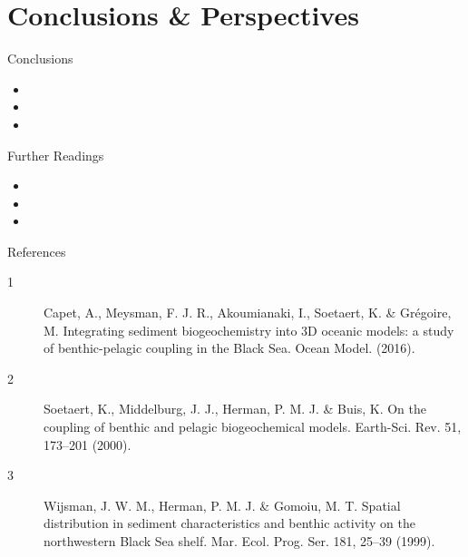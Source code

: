 \documentclass[final]{beamer}
\begin{document}
\begin{frame}[fragile]
\begin{columns}[T]
\begin{column}{.33\textwidth}
	  

	
	
	\section{Conclusions \& Perspectives}
	\begin{alertblock}{Conclusions}
	      \begin{itemize}
		    \item 
	        \item 
	        \item 
	      \end{itemize}
	\end{alertblock}
	
	\begin{block}{Further Readings}
	      \begin{itemize}
		    \item 
	        \item 
	        \item 
	      \end{itemize}
	\end{block}
	
	\begin{block}{References}
	  \footnotesize
	  \begin{description}
	    \item[1] Capet, A., Meysman, F. J. R., Akoumianaki, I., Soetaert, K. \& Grégoire, M. Integrating sediment biogeochemistry into 3D oceanic models: a study of benthic-pelagic coupling in the Black Sea. Ocean Model. (2016).
	    \item[2] Soetaert, K., Middelburg, J. J., Herman, P. M. J. \& Buis, K. On the coupling of benthic and pelagic biogeochemical models. Earth-Sci. Rev. 51, 173–201 (2000).
	    \item[3] Wijsman, J. W. M., Herman, P. M. J. \& Gomoiu, M. T. Spatial distribution in sediment characteristics and benthic activity on the northwestern Black Sea shelf. Mar. Ecol. Prog. Ser. 181, 25–39 (1999).	  \end{description}
	\end{block}
      \end{column}
      

\end{columns}
\end{frame}
\end{document}

